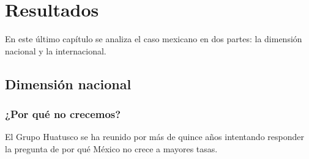 \chapter{Resultados}

\noindent En este último capítulo se analiza el caso mexicano en dos partes: la dimensión nacional y la internacional. 

\newpage

\section{Dimensión nacional}

\subsection{¿Por qué no crecemos?}

\noindent El Grupo Huatusco se ha reunido por más de quince años intentando responder la pregunta de por qué México no crece a mayores tasas.


